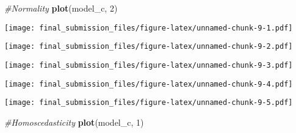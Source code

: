 \documentclass[
]{article}
\newenvironment{Shaded}{\begin{snugshade}}{\end{snugshade}}
\newcommand{\CommentTok}[1]{\textcolor[rgb]{0.56,0.35,0.01}{\textit{#1}}}
\newcommand{\DecValTok}[1]{\textcolor[rgb]{0.00,0.00,0.81}{#1}}
\newcommand{\FunctionTok}[1]{\textcolor[rgb]{0.13,0.29,0.53}{\textbf{#1}}}
\newcommand{\NormalTok}[1]{#1}
\newcommand{\SpecialCharTok}[1]{\textcolor[rgb]{0.81,0.36,0.00}{\textbf{#1}}}
\begin{document}
\begin{Shaded}
\begin{Highlighting}[]
\CommentTok{\#Normality}
\FunctionTok{plot}\NormalTok{(model\_c, }\DecValTok{2}\NormalTok{)}
\end{Highlighting}
\end{Shaded}

\texttt{[image: final\_submission\_files/figure-latex/unnamed-chunk-9-1.pdf]}

\begin{Shaded}
\end{Shaded}

\texttt{[image: final\_submission\_files/figure-latex/unnamed-chunk-9-2.pdf]}

\begin{Shaded}
\end{Shaded}

\texttt{[image: final\_submission\_files/figure-latex/unnamed-chunk-9-3.pdf]}

\begin{Shaded}
\end{Shaded}

\texttt{[image: final\_submission\_files/figure-latex/unnamed-chunk-9-4.pdf]}

\begin{Shaded}
\end{Shaded}

\texttt{[image: final\_submission\_files/figure-latex/unnamed-chunk-9-5.pdf]}

\begin{Shaded}
\begin{Highlighting}[]
\CommentTok{\#Homoscedasticity}
\FunctionTok{plot}\NormalTok{(model\_c, }\DecValTok{1}\NormalTok{)}
\end{Highlighting}
\end{Shaded}
\end{document}
